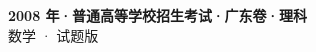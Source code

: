 \documentclass[zihao=-4, a4paper]{ctexart}
\begin{document}
\begin{center}
  {\Large\bfseries 2008 年·普通高等学校招生考试·广东卷·理科}\\[4pt]
  {\large 数学 · 试题版}
\end{center}
\medskip
{}

\end{document}
